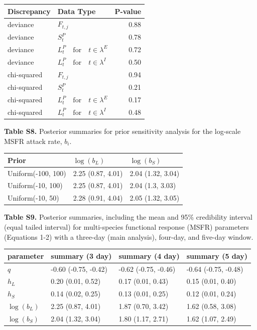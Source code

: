 \documentclass[
]{article}
\begin{document}
\begin{tabular}{llr}
\toprule
Discrepancy & Data Type & P-value\\
\midrule
deviance & $F_{t,j}$ & 0.88\\
deviance & $S_t^P$ & 0.78\\
deviance & $L_t^P\quad \text{for} \quad t \in \lambda^E$ & 0.72\\
deviance & $L_t^P\quad \text{for} \quad t \in \lambda^I$ & 0.50\\
chi-squared & $F_{t,j}$ & 0.94\\
\addlinespace
chi-squared & $S_t^P$ & 0.21\\
chi-squared & $L_t^P\quad \text{for} \quad t \in \lambda^E$ & 0.17\\
chi-squared & $L_t^P\quad \text{for} \quad t \in \lambda^I$ & 0.48\\
\bottomrule
\end{tabular}

\newpage

\textbf{Table S8.} Posterior summaries for prior sensitivity analysis
for the log-scale MSFR attack rate, \(b_i\).

\begin{tabular}{lll}
\toprule
Prior & $\log(b_L)$ & $\log(b_S)$\\
\midrule
Uniform(-100, 100) & 2.25 (0.87, 4.01) & 2.04 (1.32, 3.04)\\
Uniform(-10, 100) & 2.25 (0.87, 4.01) & 2.04 (1.3, 3.03)\\
Uniform(-10, 50) & 2.28 (0.91, 4.04) & 2.05 (1.32, 3.05)\\
\bottomrule
\end{tabular}

\vspace{24pt}

\textbf{Table S9.} Posterior summaries, including the mean and 95\%
credibility interval (equal tailed interval) for multi-species
functional response (MSFR) parameters (Equations 1-2) with a three-day
(main analysis), four-day, and five-day window.

\begin{tabular}{llll}
\toprule
parameter & summary (3 day) & summary (4 day) & summary (5 day)\\
\midrule
$q$ & -0.60 (-0.75, -0.42) & -0.62 (-0.75, -0.46) & -0.64 (-0.75, -0.48)\\
$h_L$ & 0.20 (0.01, 0.52) & 0.17 (0.01, 0.43) & 0.15 (0.01, 0.40)\\
$h_S$ & 0.14 (0.02, 0.25) & 0.13 (0.01, 0.25) & 0.12 (0.01, 0.24)\\
$\log(b_L)$ & 2.25 (0.87, 4.01) & 1.87 (0.70, 3.42) & 1.62 (0.58, 3.08)\\
$\log(b_S)$ & 2.04 (1.32, 3.04) & 1.80 (1.17, 2.71) & 1.62 (1.07, 2.49)\\
\bottomrule
\end{tabular}
\end{document}

